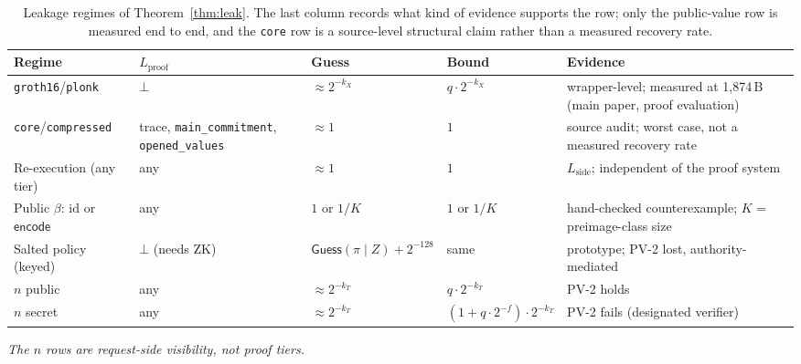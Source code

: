 \documentclass[10pt,journal,compsoc]{IEEEtran}
\newcommand{\tabfont}{\footnotesize}
\begin{document}
\begin{table}[H]
\centering
\caption{Leakage regimes of Theorem~\ref{thm:leak}. The last column records what
kind of evidence supports the row; only the public-value row is measured
end to end, and the \texttt{core} row is a source-level structural claim rather
than a measured recovery rate.}
\label{tab:regimes}
\tabfont
\setlength{\tabcolsep}{2pt}
\begin{tabular}{@{}L{0.16\columnwidth}L{0.22\columnwidth}L{0.12\columnwidth}L{0.17\columnwidth}L{0.19\columnwidth}@{}}
\toprule
Regime & $L_{\mathrm{proof}}$ & Guess & Bound & Evidence \\
\midrule
\texttt{gr\-oth16}/\allowbreak\texttt{plonk} & $\bot$ &
$\approx 2^{-k_X}$ & $q\cdot 2^{-k_X}$ &
wrapper-level; measured at 1{,}874\,B (main paper, proof evaluation) \\
\texttt{core}/\allowbreak\texttt{com\-pressed} & trace, \texttt{main\_\allowbreak commitment},
\texttt{opened\_\allowbreak values} & $\approx 1$ & $1$ &
source audit; worst case, not a measured recovery rate \\
Re-execution (any tier) & any &
$\approx 1$ & $1$ &
$L_{\mathrm{side}}$; independent of the proof system \\
Public $\beta$: $\mathrm{id}$ or $\mathsf{encode}$ & any &
$1$ or $1/K$ & $1$ or $1/K$ &
hand-checked counterexample; $K$ = preimage-class size \\
Salted policy (keyed) & $\bot$ (needs ZK) &
$\mathsf{Guess}(\pi\mid Z)+2^{-128}$ & same &
prototype; PV-2 lost, authority-mediated \\
$n$ public & any & $\approx 2^{-k_T}$ & $q\cdot2^{-k_T}$ &
PV-2 holds \\
$n$ secret & any & $\approx 2^{-k_T}$ &
$(1+q\cdot2^{-f})\cdot2^{-k_T}$ & PV-2 fails (designated verifier) \\
\bottomrule
\end{tabular}
\par\smallskip
\noindent\emph{The $n$ rows are request-side visibility, not proof tiers.}
\end{table}
\end{document}
